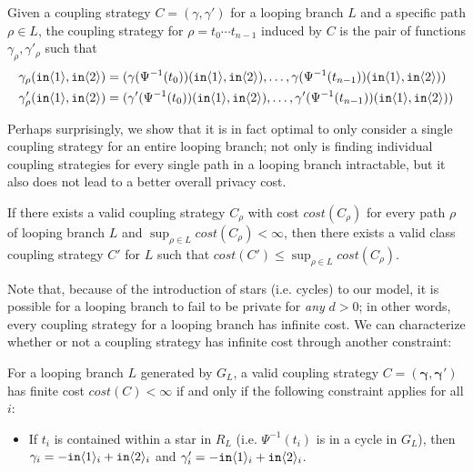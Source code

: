 \begin{defn}
    Given a coupling strategy $C = (\gamma, \gamma')$ for a looping branch $L$ and a specific path $\rho\in L$, the coupling strategy for $\rho=t_0\cdots t_{n-1}$ induced by $C$ is the pair of functions $\gamma_\rho, \gamma'_\rho$ such that 
    \begin{align*}
        \gamma_\rho(\texttt{in}\langle1 \rangle, \texttt{in}\langle2 \rangle) &= (\gamma(\Psi^{-1}(t_0))(\texttt{in}\langle1 \rangle, \texttt{in}\langle2 \rangle), \ldots,\gamma(\Psi^{-1}(t_{n-1}))(\texttt{in}\langle1 \rangle, \texttt{in}\langle2 \rangle) )\\
        \gamma'_\rho(\texttt{in}\langle1 \rangle, \texttt{in}\langle2 \rangle) &= (\gamma'(\Psi^{-1}(t_0))(\texttt{in}\langle1 \rangle, \texttt{in}\langle2 \rangle),\ldots,\gamma'(\Psi^{-1}(t_{n-1}))(\texttt{in}\langle1 \rangle, \texttt{in}\langle2 \rangle) )
    \end{align*}
\end{defn}

Perhaps surprisingly, we show that it is in fact optimal to only consider a single coupling strategy for an entire looping branch; not only is finding individual coupling strategies for every single path in a looping branch intractable, but it also does not lead to a better overall privacy cost. 

\begin{prop}\label{ClassCouplingStrategiesAreEnoughProp}
    If there exists a valid coupling strategy $C_\rho$ with cost $cost(C_\rho)$ for every path $\rho$ of looping branch $L$ and $\sup_{\rho\in L}cost(C_\rho)< \infty$, then there exists a valid class coupling strategy $C'$ for $L$ such that $cost(C') \leq \sup_{\rho\in L}cost(C_\rho)$. 
\end{prop}

Note that, because of the introduction of stars (i.e. cycles) to our model, it is possible for a looping branch to fail to be private for \textit{any} $d>0$; in other words, every coupling strategy for a looping branch has infinite cost. We can characterize whether or not a coupling strategy has infinite cost through another constraint:

\begin{lemma}\label{finiteCostConstraintLemma}
    For a looping branch $L$ generated by $G_L$, a valid coupling strategy $C = (\mathbf{\gamma}, \mathbf{\gamma}')$ has finite cost $cost(C)<\infty$ if and only if the following constraint applies for all $i$:
    \begin{itemize}
        \item If $t_i$ is contained within a star in $R_L$ (i.e. $\Psi^{-1}(t_i)$ is in a cycle in $G_L$), then $\gamma_i = -\texttt{in}\langle1 \rangle_i+\texttt{in}\langle2 \rangle_i$ and $\gamma_i' = -\texttt{in}\langle1 \rangle_i+\texttt{in}\langle2 \rangle_i$.
    \end{itemize}
\end{lemma}

